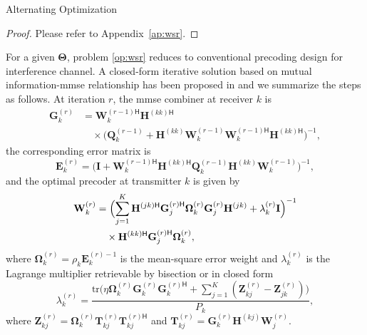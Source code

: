 \documentclass[
	fontsize=11pt,
	paper=a4,
	foldmarks=false
]{scrartcl}
\begin{document}
\begin{reviewer}
{{\begin{subsubsection}{Alternating Optimization}
					\begin{proof}
						Please refer to Appendix~\ref{ap:wsr}.
					\end{proof}

					For a given $\mathbf{\Theta}$, problem \eqref{op:wsr} reduces to conventional precoding design for interference channel.
					A closed-form iterative solution based on mutual information-\gls{mmse} relationship has been proposed in \cite{Shin2012,Negro2010} and we summarize the steps as follows.
					At iteration $r$, the \gls{mmse} combiner at receiver $k$ is
					\begin{equation*}
						\begin{split}
							\mathbf{G}_k^{(r)} &= {\mathbf{W}_k^{(r-1)\mathsf{H}}} {\mathbf{H}^{(kk)\mathsf{H}}} \\
							& \quad \times \bigl(\mathbf{Q}_k^{(r-1)} + {\mathbf{H}^{(kk)}} \mathbf{W}_k^{(r-1)} {\mathbf{W}_k^{(r-1)\mathsf{H}}} {\mathbf{H}^{(kk)\mathsf{H}}}\bigr)^{-1},
						\end{split}
					\end{equation*}
					the corresponding error matrix is
					\begin{equation*}
						\mathbf{E}_k^{(r)} = \bigl(\mathbf{I} + {\mathbf{W}_k^{(r-1)\mathsf{H}}} {\mathbf{H}^{(kk)\mathsf{H}}} \mathbf{Q}_k^{(r-1)} {\mathbf{H}^{(kk)}} \mathbf{W}_k^{(r-1)}\bigr)^{-1},
					\end{equation*}
					and the optimal precoder at transmitter $k$ is given by
					\begin{equation*}
						\begin{split}
							\mathbf{W}_k^{(r)} & = \Bigl(\sum_{j=1}^K {\mathbf{H}^{(jk)\mathsf{H}}} {\mathbf{G}_j^{(r)\mathsf{H}}} \mathbf{\Omega}_k^{(r)} \mathbf{G}_j^{(r)} \mathbf{H}^{(jk)} + \lambda_k^{(r)} \mathbf{I} \Bigr)^{-1} \\
							& \quad \times {\mathbf{H}^{(kk)\mathsf{H}}} {\mathbf{G}_j^{(r)\mathsf{H}}} \mathbf{\Omega}_k^{(r)},
						\end{split}
					\end{equation*}
					where $\mathbf{\Omega}_k^{(r)} = \rho_k {\mathbf{E}_k^{(r)-1}}$ is the mean-square error weight and $\lambda_k^{(r)}$ is the Lagrange multiplier retrievable by bisection \cite{Shin2012} or in closed form \cite{Negro2010}
					\begin{equation*}
						\lambda_k^{(r)} = \frac{\mathrm{tr}\bigl(\eta \mathbf{\Omega}_k^{(r)} \mathbf{G}_k^{(r)}{\mathbf{G}_k^{(r)\mathsf{H}}} + \sum_{j=1}^K (\mathbf{Z}_{kj}^{(r)} - \mathbf{Z}_{jk}^{(r)}) \bigr)}{P_k},
					\end{equation*}
					where $\mathbf{Z}_{kj}^{(r)} = \mathbf{\Omega}_k^{(r)}\mathbf{T}_{kj}^{(r)} {\mathbf{T}_{kj}^{(r)\mathsf{H}}}$ and $\mathbf{T}_{kj}^{(r)} = \mathbf{G}_k^{(r)} {\mathbf{H}^{(kj)}} \mathbf{W}_j^{(r)}$.


\end{subsubsection}}}
\end{reviewer}
\end{document}
